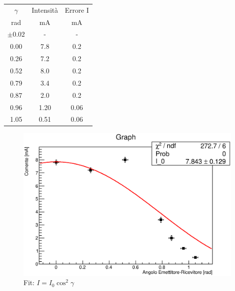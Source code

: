 \begin{table}[H]
    \begin{center}
    \begin{tabular}{|c|c|c|}
\hline
        $ \gamma $	&	Intensità	&	Errore I	\\
        rad	&	mA	&	mA	\\
        $ \pm 0.02 $	&	-	&	-	\\ 
        \hline
        0.00	&	7.8	    &	0.2	    \\
        0.26	&	7.2	    &	0.2	    \\
        0.52	&	8.0	    &	0.2	    \\
        0.79	&	3.4	    &	0.2	    \\
        0.87	&	2.0	    &	0.2	    \\
        0.96	&	1.20	&	0.06	\\
        1.05	&	0.51	&	0.06	\\ 
        \hline
    \end{tabular}
    \end{center}
\end{table}
%
%
%
%
    \begin{figure}[H]
        \centering
        \includegraphics[scale=0.8]{Grafici/O4_P2_malus.eps}
        \caption{Fit: $ I = I_0 \cos^2\gamma $ }
        \label{fig:C3_P2_RL}
    \end{figure} 